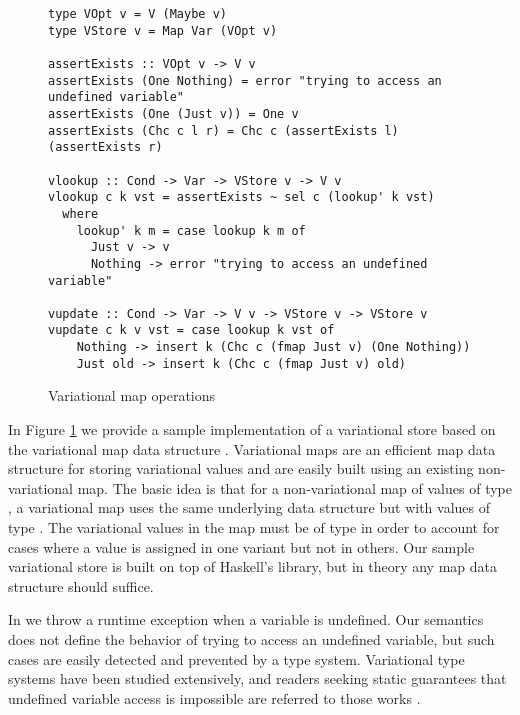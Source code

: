 \documentclass[12pt,oneside]{book}
\begin{document}
\begin{figure}
\begin{lstlisting}
type VOpt v = V (Maybe v)
type VStore v = Map Var (VOpt v)

assertExists :: VOpt v -> V v
assertExists (One Nothing) = error "trying to access an undefined variable"
assertExists (One (Just v)) = One v
assertExists (Chc c l r) = Chc c (assertExists l) (assertExists r)

vlookup :: Cond -> Var -> VStore v -> V v
vlookup c k vst = assertExists ~ sel c (lookup' k vst)
  where
    lookup' k m = case lookup k m of
      Just v -> v
      Nothing -> error "trying to access an undefined variable"

vupdate :: Cond -> Var -> V v -> VStore v -> VStore v
vupdate c k v vst = case lookup k vst of
    Nothing -> insert k (Chc c (fmap Just v) (One Nothing))
    Just old -> insert k (Chc c (fmap Just v) old)
\end{lstlisting}
\caption{Variational map operations}
\label{fig:varmap}
\end{figure}

In Figure \ref{fig:varmap} we provide a sample implementation of a variational store based on the variational map data structure \cite{varwhile, Walk14onward}.
Variational maps are an efficient map data structure for storing variational values and are easily built using an existing non-variational map. The basic idea
is that for a non-variational map of values of type , a variational map uses the same underlying data structure but with values of type .
The variational values in the map must be of type  in order to account for cases where a value is assigned in one variant but not in others. Our sample
variational store is built on top of Haskell's  library, but in theory any map data structure should suffice.

In  we throw a runtime exception when a variable is undefined. Our semantics does not define the behavior of trying to access an undefined variable, but
such cases are easily detected and prevented by a type system. Variational type systems have been studied extensively, and readers seeking static guarantees
that undefined variable access is impossible are referred to those works \cite{kenner2010typechef,CEW12icfp,CEW14toplas}.
\end{document}
